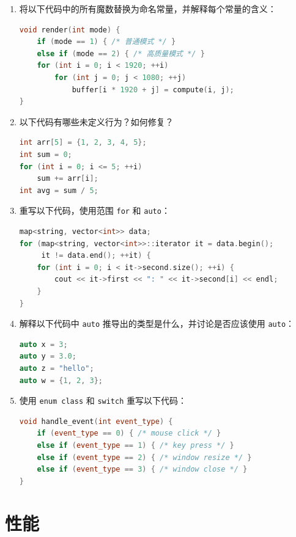\begin{enumerate}
\item 将以下代码中的所有魔数替换为命名常量，并解释每个常量的含义：
\begin{lstlisting}[language=C++]
void render(int mode) {
    if (mode == 1) { /* 普通模式 */ }
    else if (mode == 2) { /* 高质量模式 */ }
    for (int i = 0; i < 1920; ++i)
        for (int j = 0; j < 1080; ++j)
            buffer[i * 1920 + j] = compute(i, j);
}
\end{lstlisting}

\item 以下代码有哪些未定义行为？如何修复？
\begin{lstlisting}[language=C++]
int arr[5] = {1, 2, 3, 4, 5};
int sum = 0;
for (int i = 0; i <= 5; ++i)
    sum += arr[i];
int avg = sum / 5;
\end{lstlisting}

\item 重写以下代码，使用范围 \texttt{for} 和 \texttt{auto}：
\begin{lstlisting}[language=C++]
map<string, vector<int>> data;
for (map<string, vector<int>>::iterator it = data.begin();
     it != data.end(); ++it) {
    for (int i = 0; i < it->second.size(); ++i) {
        cout << it->first << ": " << it->second[i] << endl;
    }
}
\end{lstlisting}

\item 解释以下代码中 \texttt{auto} 推导出的类型是什么，并讨论是否应该使用 \texttt{auto}：
\begin{lstlisting}[language=C++]
auto x = 3;
auto y = 3.0;
auto z = "hello";
auto w = {1, 2, 3};
\end{lstlisting}

\item 使用 \texttt{enum class} 和 \texttt{switch} 重写以下代码：
\begin{lstlisting}[language=C++]
void handle_event(int event_type) {
    if (event_type == 0) { /* mouse click */ }
    else if (event_type == 1) { /* key press */ }
    else if (event_type == 2) { /* window resize */ }
    else if (event_type == 3) { /* window close */ }
}
\end{lstlisting}
\end{enumerate}


\chapter{性能}

